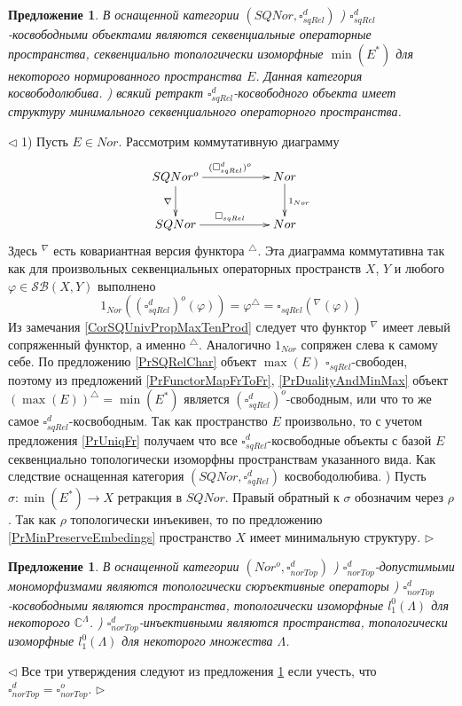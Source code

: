 \documentclass[12pt]{article}
\newtheorem{proposition}[theorem]{Предложение}
\newenvironment{proof}{\par $\triangleleft$}{$\triangleright$}
\begin{document}
\begin{proposition}\label{PrSQReldChar}
В оснащенной категории $(SQNor,\square_{sqRel}^d)$
) $\square_{sqRel}^d$-косвободными объектами являются секвенциальные операторные пространства, секвенциально топологически изоморфные $\min(E^*)$ для некоторого нормированного пространства $E$. Данная категория косвободолюбива. 
) всякий ретракт $\square_{sqRel}^d$-косвободного объекта имеет структуру минимального секвенциального операторного пространства.
\end{proposition}
\begin{proof}
1) Пусть $E\in Nor$. Рассмотрим коммутативную диаграмму
$$
\xymatrix{
SQNor^o \ar[d]_{\nabla } \ar[rr]^{(\square_{sqRel}^{d})^o} & & {Nor}\ar[d]^{1_{Nor}}\\
SQNor\ar[rr]^{\square_{sqRel}}&  &{Nor}}
$$
Здесь ${}^\nabla$ есть ковариантная версия функтора ${}^\triangle$.
Эта диаграмма коммутативна так как для произвольных секвенциальных операторных пространств $X$, $Y$ и любого $\varphi\in\mathcal{SB}(X,Y)$ выполнено
$$
1_{Nor}((\square_{sqRel}^d)^o(\varphi))
=\varphi^\triangle
=\square_{sqRel}({}^\nabla(\varphi))
$$
Из замечания \ref{CorSQUnivPropMaxTenProd} следует что функтор ${}^\nabla$ имеет левый сопряженный функтор, а именно ${}^\triangle$. Аналогично $1_{Nor}$ сопряжен слева к самому себе. 
По предложению \ref{PrSQRelChar} объект $\max(E)$ $\square_{sqRel}$-свободен, поэтому из предложений \ref{PrFunctorMapFrToFr}, \ref{PrDualityAndMinMax} объект 
$(\max(E))^\triangle=\min(E^*)$ является $(\square_{sqRel}^d)^o$-свободным, или что то же самое $\square_{sqRel}^d$-косвободным. 
Так как пространство $E$ произвольно, то с учетом предложения \ref{PrUniqFr} получаем что все $\square_{sqRel}^d$-косвободные объекты с базой 
$E$ секвенциально топологически изоморфны пространствам указанного вида. Как следствие оснащенная категория $(SQNor,\square_{sqRel}^d)$ косвободолюбива.
) Пусть $\sigma:\min(E^*)\to X$ ретракция в $SQNor$. Правый обратный к $\sigma$ обозначим через $\rho$. Так как $\rho$ топологически инъекивен, то по предложению \ref{PrMinPreserveEmbedings} пространство $X$ имеет минимальную структуру.
\end{proof}

\begin{proposition}\label{PrNorTopdChar}
В оснащенной категории $(Nor^o, \square_{norTop}^d)$
) $\square_{norTop}^d$-допустимыми мономорфизмами являются топологически сюръективные операторы
) $\square_{norTop}^d$-косвободными являются пространства, топологически изоморфные $l_1^0(\Lambda)$ для некоторого $\mathbb{C}^\Lambda$.
) $\square_{norTop}^d$-инъективными являются пространства, топологически изоморфные $l_1^0(\Lambda)$ для некоторого множества $\Lambda$. 
\end{proposition}
\begin{proof}
Все три утверждения следуют из предложения \ref{PrNorTopdChar} если учесть, что $\square_{norTop}^d=\square_{norTop}^o$.
\end{proof}
\end{document}
